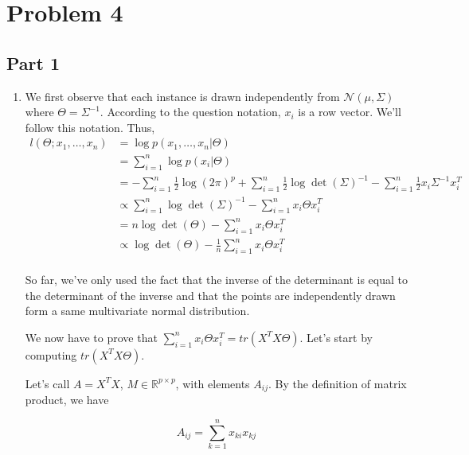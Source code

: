 \documentclass{article}
\begin{document}

\section*{Problem 4}


\subsection*{Part 1}

\begin{enumerate}

\item
We first observe that each instance is drawn independently from $\mathcal{N}(\mu,\Sigma)$ where $\Theta = \Sigma^{-1}$.
According to the question notation, $x_i$ is a row vector. We'll follow this notation.
Thus,
\begin{equation*}
\begin{split}
l(\Theta;x_1,\dots,x_n) &= \log p(x_1,\dots,x_n|\Theta)\\
&= \sum_{i=1}^{n} \log p(x_i |\Theta)\\
&= - \sum_{i=1}^{n} \frac{1}{2}\log(2\pi)^p + \sum_{i=1}^{n}\frac{1}{2}\log \det(\Sigma)^{-1} - \sum_{i=1}^{n}\frac{1}{2}x_i\Sigma^{-1} x_i^T\\
&\propto \sum_{i=1}^{n}\log \det(\Sigma)^{-1} - \sum_{i=1}^{n}x_i\Theta x_i^T\\
&= n\log \det(\Theta) - \sum_{i=1}^{n}x_i\Theta x_i^T\\
&\propto \log \det(\Theta) - \frac{1}{n}\sum_{i=1}^{n}x_i\Theta x_i^T\\
\end{split}
\end{equation*}

So far, we've only used the fact that the inverse of the determinant is equal to the determinant of the inverse and that the points are independently drawn form a same multivariate normal distribution.

We now have to prove that $\sum_{i=1}^{n}x_i\Theta x_i^T = tr(X^TX\Theta)$. Let's start by computing $tr(X^TX\Theta)$.

Let's call $A = X^TX$, $M\in\mathbb{R}^{p\times p}$, with elements $A_{ij}$. By the definition of matrix product, we have

\begin{equation*}
A_{ij} = \sum_{k=1}^n x_{ki}x_{kj}
\end{equation*}


\end{enumerate}
\end{document}
